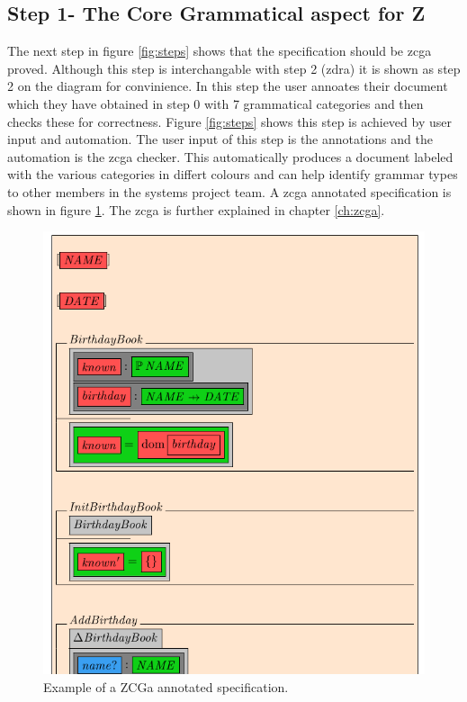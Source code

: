 \subsection{Step 1- The Core Grammatical aspect for Z}

The next step in figure \ref{fig:steps} shows that the specification should be \gls{zcga} proved. Although this step is interchangable with step 2 (\gls{zdra}) it is shown as step 2 on the diagram for convinience. In this step the user annoates their document which they have obtained in step 0 with 7 grammatical categories and then checks these for correctness. Figure \ref{fig:steps} shows this step is achieved by user input and automation. The user input of this step is the annotations and the automation is the \gls{zcga} checker. This automatically produces a document labeled with the various categories in differt colours and can help identify grammar types to other members in the systems project team. A \gls{zcga} annotated specification is shown in figure \ref{fig:zcgaexample}. The \gls{zcga} is further explained in chapter \ref{ch:zcga}.

\begin{figure}[H]
 \begin{center}
 \includegraphics [scale=0.25]{Figures/Design/zcgaexample.png}
 \caption{Example of a ZCGa annotated specification.}
 \label{fig:zcgaexample}
\end{center}
\end{figure} 

